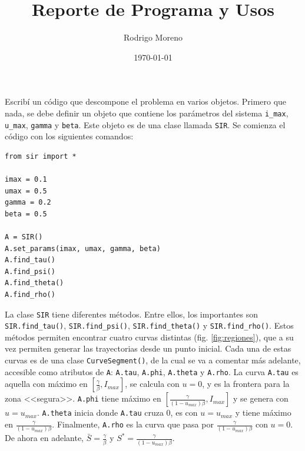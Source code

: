 \documentclass{article}
\title{Reporte de Programa y Usos}
\author{Rodrigo Moreno}
\date{\today}
\begin{document}
\maketitle

Escribí un código que descompone el problema en varios objetos. Primero que nada, se debe definir un objeto que contiene los parámetros del sistema \texttt{i\_max}, \texttt{u\_max}, \texttt{gamma} y \texttt{beta}. Este objeto es de una clase llamada \texttt{SIR}. Se comienza el código con los siguientes comandos:
\begin{lstlisting}[basicstyle = \ttfamily]%, language = Python]
from sir import *

imax = 0.1
umax = 0.5
gamma = 0.2
beta = 0.5

A = SIR()
A.set_params(imax, umax, gamma, beta)
A.find_tau()
A.find_psi()
A.find_theta()
A.find_rho()
\end{lstlisting}
La clase \texttt{SIR} tiene diferentes métodos. Entre ellos, los importantes son \texttt{SIR.find\_tau()}, \texttt{SIR.find\_psi()}, \texttt{SIR.find\_theta()} y \texttt{SIR.find\_rho()}. Estos métodos permiten encontrar cuatro curvas distintas (fig. \ref{fig:regiones}), que a su vez permiten generar las trayectorias desde un punto inicial. Cada una de estas curvas es de una clase \texttt{CurveSegment()}, de la cual se va a comentar más adelante, accesible como atributos de \texttt{A}: \texttt{A.tau}, \texttt{A.phi}, \texttt{A.theta} y \texttt{A.rho}. La curva \texttt{A.tau} es aquella con máximo en $[\tfrac{\gamma}{\beta}, I_{max}]$, se calcula con $u = 0$, y es la frontera para la zona <<segura>>. \texttt{A.phi} tiene máximo en $[\tfrac{\gamma}{(1-u_{max})\beta}, I_{max}]$ y se genera con $u = u_{max}$. \texttt{A.theta} inicia donde \texttt{A.tau} cruza 0, es con $u = u_{max}$ y tiene máximo en $\frac{\gamma}{(1-u_{max})\beta}$. Finalmente, \texttt{A.rho} es la curva que pasa por $\frac{\gamma}{(1-u_{max})\beta}$ con $u = 0$. De ahora en adelante, $\bar{S} = \tfrac{\gamma}{\beta}$ y $S^* = \tfrac{\gamma}{(1 - u_{max})\beta}$.
\end{document}
